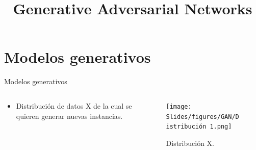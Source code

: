 



\title{Generative Adversarial Networks}


\maketitle

\section{Modelos generativos}

\begin{frame}{Modelos generativos}
    \begin{columns}[T]
    \begin{column}{.48\textwidth}
    
    \begin{itemize}
        \item Distribución de datos \alert{X} de la cual se quieren generar \alert{nuevas instancias}.
    \end{itemize}

    \end{column}
    \hfill
    \begin{column}{.48\textwidth}
    
    \begin{figure}
        \centering
        \texttt{[image: Slides/figures/GAN/Distribución 1.png]}
        \caption{Distribución X.}
    \end{figure}
    
    \end{column}
    \end{columns}
\end{frame}

